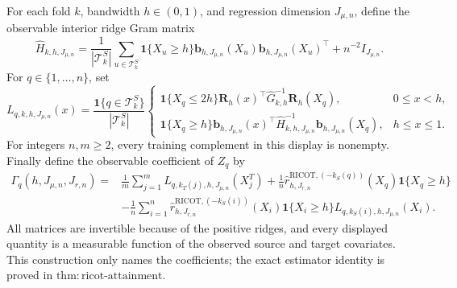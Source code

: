 For each fold \(k\), bandwidth \(h\in(0,1)\), and regression dimension \(J_{\mu,n}\), define the observable interior ridge Gram matrix
\[
\widehat H_{k,h,J_{\mu,n}}
=\frac1{|\mathcal T^S_k|}\sum_{u\in\mathcal T^S_k}\mathbf 1\{X_u\ge h\}
\mathbf b_{h,J_{\mu,n}}(X_u)\mathbf b_{h,J_{\mu,n}}(X_u)^\top+n^{-2}I_{J_{\mu,n}}.
\]
For \(q\in\{1,\ldots,n\}\), set
\[
L_{q,k,h,J_{\mu,n}}(x)=\frac{\mathbf 1\{q\in\mathcal T^S_k\}}{|\mathcal T^S_k|}
\begin{cases}
\mathbf 1\{X_q\le2h\}\mathbf R_h(x)^\top\widehat G_{k,h}^{-1}\mathbf R_h(X_q),&0\le x<h,\\
\mathbf 1\{X_q\ge h\}\mathbf b_{h,J_{\mu,n}}(x)^\top\widehat H_{k,h,J_{\mu,n}}^{-1}\mathbf b_{h,J_{\mu,n}}(X_q),&h\le x\le1.
\end{cases}
\]
For integers \(n,m\ge2\), every training complement in this display is nonempty. Finally define the observable coefficient of \(Z_q\) by
\[
\begin{aligned}
\Gamma_q(h,J_{\mu,n},J_{r,n})={}&
\frac1m\sum_{j=1}^mL_{q,k_T(j),h,J_{\mu,n}}(X_j^T)
+\frac1n\widehat r^{\mathrm{RICOT},(-k_S(q))}_{h,J_{r,n}}(X_q)\mathbf 1\{X_q\ge h\}\\
&-\frac1n\sum_{i=1}^n
\widehat r^{\mathrm{RICOT},(-k_S(i))}_{h,J_{r,n}}(X_i)\mathbf 1\{X_i\ge h\}
L_{q,k_S(i),h,J_{\mu,n}}(X_i).
\end{aligned}
\]
All matrices are invertible because of the positive ridges, and every displayed quantity is a measurable function of the observed source and target covariates. This construction only names the coefficients; the exact estimator identity is proved in \(\mathrm{thm:ricot\text{-}attainment}\).
